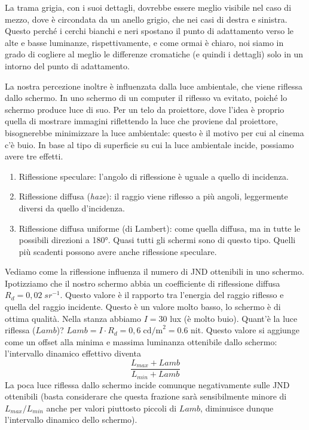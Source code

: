 \documentclass[a4paper,11pt]{article}
\begin{document}
La trama grigia, con i suoi dettagli, dovrebbe essere meglio visibile nel caso di mezzo, dove è circondata da un anello grigio, che nei casi di destra e sinistra.
Questo perché i cerchi bianchi e neri spostano il punto di adattamento verso le alte e basse luminanze, rispettivamente, e come ormai è chiaro, noi siamo
in grado di cogliere al meglio le differenze cromatiche (e quindi i dettagli) solo in un intorno del punto di adattamento.
\par
La nostra percezione inoltre è influenzata dalla luce ambientale, che viene riflessa dallo schermo. In uno schermo di un computer il riflesso va evitato, poiché lo schermo produce luce di suo.
Per un telo da proiettore, dove l'idea è proprio quella di mostrare immagini riflettendo la luce che proviene dal proiettore,
bisognerebbe minimizzare la luce ambientale: questo è il motivo per cui al cinema c'è buio.
In base al tipo di superficie su cui la luce ambientale incide, possiamo avere tre effetti.
\begin{enumerate}
    \item Riflessione speculare: l'angolo di riflessione è uguale a quello di incidenza.
    \item Riflessione diffusa (\textit{haze}): il raggio viene riflesso a più angoli, leggermente diversi da quello d'incidenza.
    \item Riflessione diffusa uniforme (di Lambert): come quella diffusa, ma in tutte le possibili direzioni a 180°.
    Quasi tutti gli schermi sono di questo tipo. Quelli più scadenti possono avere anche riflessione speculare.
\end{enumerate}
\par
Vediamo come la riflessione influenza il numero di JND ottenibili in uno schermo. Ipotizziamo che il nostro schermo abbia
un coefficiente di riflessione diffusa $R_d = 0,02 \; sr^{-1}$. Questo valore è il rapporto tra l'energia del raggio
riflesso e quella del raggio incidente. Questo è un valore molto basso, lo schermo è di ottima qualità.
Nella stanza abbiamo $I = 30$ lux (è molto buio). Quant'è la luce riflessa ($Lamb$)?
$Lamb = I \cdot R_d = 0,6\; \text{cd/m}^2 = 0.6$ nit.
Questo valore si aggiunge come un offset alla minima e massima luminanza ottenibile dallo schermo: l'intervallo dinamico effettivo diventa
\[\frac{L_{max}+Lamb}{L_{min}+Lamb}\]
La poca luce riflessa dallo schermo incide comunque negativamente sulle JND ottenibili (basta considerare che questa frazione sarà sensibilmente minore di $L_{max}/L_{min}$
anche per valori piuttosto piccoli di $Lamb$, diminuisce dunque l'intervallo dinamico dello schermo).
\end{document}
